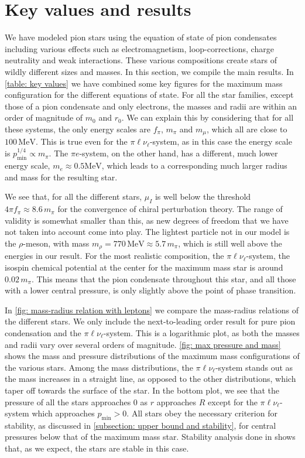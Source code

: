 \section{Key values and results}

We have modeled pion stars using the equation of state of pion condensates including various effects such as electromagnetism, loop-corrections, charge neutrality and weak interactions.
These various compositions create stars of wildly different sizes and masses.
In this section, we compile the main results.
In \autoref{table: key values} we have combined some key figures for the maximum mass configuration for the different equations of state.
For all the star families, except those of a pion condensate and only electrons, the masses and radii are within an order of magnitude of $m_0$ and $r_0$.
We can explain this by considering that for all these systems, the only energy scales are $f_\pi$, $m_\pi$ and $m_\mu$, which all are close to $100\,\text{MeV}$.
This is true even for the $\pi\ell\nu_\ell$-system, as in this case the energy scale is $p_\text{min}^{1/4}\propto m_\pi$.
The $\pi e$-system, on the other hand, has a different, much lower energy scale, $m_e \approx 0.5 \text{MeV}$, which leads to a corresponding much larger radius and mass for the resulting star.

We see that, for all the different stars, $\mu_I$ is well below the threshold $4\pi f_\pi \approx 8.6 \, m_\pi$ for the convergence of chiral perturbation theory.
The range of validity is somewhat smaller than this, as new degrees of freedom that we have not taken into account come into play.
The lightest particle not in our model is the $\rho$-meson, with mass $m_\rho = 770 \, \text{MeV} \approx 5.7 \, m_\pi$, which is still well above the energies in our result.
For the most realistic composition, the $\pi\ell\nu_\ell$-system, the isospin chemical potential at the center for the maximum mass star is around $0.02\,m_\pi$.
This means that the pion condensate throughout this star, and all those with a lower central pressure, is only slightly above the point of phase transition.

In \autoref{fig: mass-radius relation with leptons} we compare the mass-radius relations of the different stars.
We only include the next-to-leading order result for pure pion condensation and the $\pi \ell \nu_\ell$-system.
This is a logarithmic plot, as both the masses and radii vary over several orders of magnitude.
\autoref{fig: max pressure and mass} shows the mass and pressure distributions of the maximum mass configurations of the various stars.
Among the mass distributions, the $\pi\ell\nu_\ell$-system stands out as the mass increases in a straight line, as opposed to the other distributions, which taper off towards the surface of the star.
In the bottom plot, we see that the pressure of all the stars approaches $0$ as $r$ approaches $R$ except for the $\pi\ell\nu_\ell$-system which approaches $p_\text{min}>0$.
All stars obey the necessary criterion for stability, as discussed in \autoref{subsection: upper bound and stability}, for central pressures below that of the maximum mass star.
Stability analysis done in \autocite{brandtNewClassCompact2018} shows that, as we expect, the stars are stable in this case.


